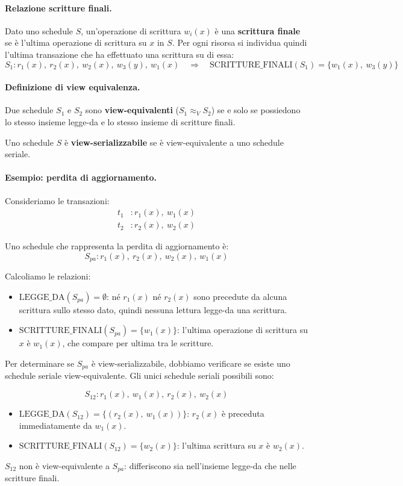 \paragraph{Relazione scritture finali.}
Dato uno schedule $S$, un'operazione di scrittura $w_i(x)$ è una \textbf{scrittura finale} se è l'ultima operazione di scrittura su $x$ in $S$. Per ogni risorsa si individua quindi l'ultima transazione che ha effettuato una scrittura su di essa:
\[
S_1 : r_1(x),\ r_2(x),\ w_2(x),\ w_3(y),\ w_1(x) \quad \Rightarrow \quad \text{SCRITTURE\_FINALI}(S_1) = \{w_1(x),\ w_3(y)\}
\]

\paragraph{Definizione di view equivalenza.}
Due schedule $S_1$ e $S_2$ sono \textbf{view-equivalenti} ($S_1 \approx_V S_2$) se e solo se possiedono lo stesso insieme legge-da e lo stesso insieme di scritture finali.

Uno schedule $S$ è \textbf{view-serializzabile} se è view-equivalente a uno schedule seriale.
\paragraph{Esempio: perdita di aggiornamento.}

Consideriamo le transazioni:
\begin{align*}
	t_1 &: r_1(x),\ w_1(x) \\
	t_2 &: r_2(x),\ w_2(x)
\end{align*}

Uno schedule che rappresenta la perdita di aggiornamento è:
\[
S_{pa} : r_1(x),\ r_2(x),\ w_2(x),\ w_1(x)
\]

Calcoliamo le relazioni:
\begin{itemize}
	\item $\text{LEGGE\_DA}(S_{pa}) = \emptyset$: né $r_1(x)$ né $r_2(x)$ sono precedute da alcuna scrittura sullo stesso dato, quindi nessuna lettura legge-da una scrittura.
	\item $\text{SCRITTURE\_FINALI}(S_{pa}) = \{w_1(x)\}$: l'ultima operazione di scrittura su $x$ è $w_1(x)$, che compare per ultima tra le scritture.
\end{itemize}

Per determinare se $S_{pa}$ è view-serializzabile, dobbiamo verificare se esiste uno schedule seriale view-equivalente. Gli unici schedule seriali possibili sono:

\[
S_{12} : r_1(x),\ w_1(x),\ r_2(x),\ w_2(x)
\]
\begin{itemize}
	\item $\text{LEGGE\_DA}(S_{12}) = \{(r_2(x),\ w_1(x))\}$: $r_2(x)$ è preceduta immediatamente da $w_1(x)$.
	\item $\text{SCRITTURE\_FINALI}(S_{12}) = \{w_2(x)\}$: l'ultima scrittura su $x$ è $w_2(x)$.
\end{itemize}
$S_{12}$ non è view-equivalente a $S_{pa}$: differiscono sia nell'insieme legge-da che nelle scritture finali.

